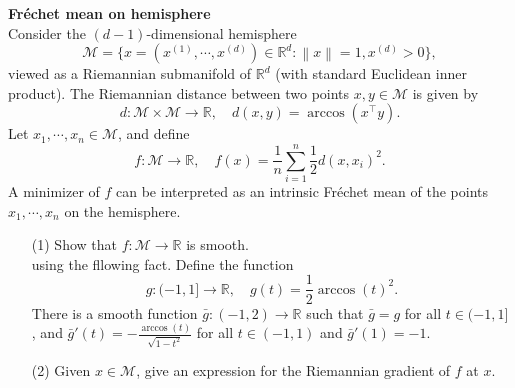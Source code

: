 \documentclass[en, oneside]{assignment}
\begin{document}
\begin{prob} \textbf{Fréchet mean on hemisphere}\\
    Consider the $(d-1)$-dimensional hemisphere
    \begin{equation*}
        \mathcal{M} = \{ x = (x^{(1)}, \cdots, x^{(d)}) \in \mathbb{R}^d : \left\lVert x \right\rVert = 1, x^{(d)} > 0\},
    \end{equation*}
    viewed as a Riemannian submanifold of $\mathbb{R}^d$ (with standard Euclidean inner product).
    The Riemannian distance between two points $x, y \in \mathcal{M}$ is given by
    \begin{equation*}
        d: \mathcal{M} \times \mathcal{M} \rightarrow \mathbb{R}, \quad d(x, y) = \arccos \left( x^{\top} y\right).
    \end{equation*}
    Let $x_1, \cdots, x_n \in \mathcal{M}$, and define
    \begin{equation*}
        f: \mathcal{M} \rightarrow \mathbb{R}, \quad f(x) = \frac{1}{n} \sum_{i=1}^n \frac{1}{2}d(x, x_i)^2.
    \end{equation*}
    A minimizer of $f$ can be interpreted as an intrinsic Fréchet mean of the points $x_1, \cdots, x_n$ on the hemisphere.
    \begin{itemize}
        \item[(1)] Show that $f: \mathcal{M} \rightarrow \mathbb{R}$ is smooth.\\
        using the fllowing fact. Define the function
        \begin{equation*}
            g: (-1, 1] \rightarrow \mathbb{R}, \quad g(t) = \frac{1}{2}\arccos(t)^2.
        \end{equation*}
        There is a smooth function $\bar{g}: (-1, 2) \rightarrow \mathbb{R}$ such that $\bar{g} = g$ for all $t \in (-1, 1]$,
        and $\bar{g}'(t) = -\frac{\arccos(t)}{\sqrt{1-t^2}}$ for all $t \in (-1, 1)$ and $\bar{g}'(1) = -1$.
        \item[(2)] Given $x \in \mathcal{M}$, give an expression for the Riemannian gradient of $f$ at $x$.
    \end{itemize}
\end{prob}
\end{document}
